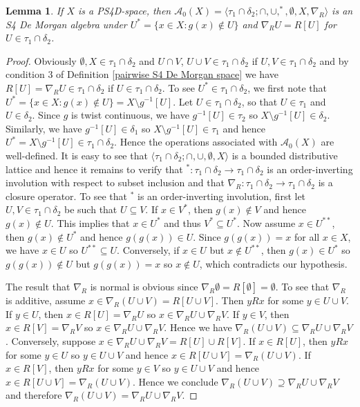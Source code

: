 \documentclass{amsart}
\theoremstyle{plain}
\newtheorem{lemma}[theorem]{Lemma}
\theoremstyle{definition}
\begin{document}
\begin{lemma}\label{space to algebra}
    If $X$ is a PS4D-space, then $\mathcal{A}_0(X)=\langle\tau_1\cap\delta_2;\cap,\cup,^*,\emptyset,X,\nabla_R\rangle$ is an S4 De Morgan algebra under $U^*=\{x\in X:g(x)\not\in U\}$ and $\nabla_RU=R[U]$ for $U\in\tau_1\cap\delta_2$.    \end{lemma}
\begin{proof}
    Obviously $\emptyset,X\in \tau_1\cap\delta_2$ and $U\cap V$, $U\cup V\in\tau_1\cap\delta_2$ if $U,V\in\tau_1\cap\delta_2$ and by condition 3 of Definition \ref{pairwise S4 De Morgan space} we have $R[U]=\nabla_R U\in\tau_1\cap\delta_2$ if $U\in\tau_1\cap\delta_2$. To see $U^*\in\tau_1\cap\delta_2$, we first note that $U^*=\{x\in X:g(x)\not\in U\}=X\setminus g^{-1}[U]$. Let $U\in\tau_1\cap\delta_2$, so that $U\in\tau_1$ and $U\in\delta_2$. Since $g$ is twist continuous, we have $g^{-1}[U]\in\tau_2$ so $X\setminus g^{-1}[U]\in\delta_2$. Similarly, we have $g^{-1}[U]\in \delta_1$ so $X\setminus g^{-1}[U]\in\tau_1$ and hence $U^*=X\setminus g^{-1}[U]\in\tau_1\cap\delta_2$. Hence the operations associated with $\mathcal{A}_0(X)$ are well-defined. It is easy to see that $\langle\tau_1\cap\delta_2;\cap,\cup,\emptyset,X\rangle$ is a bounded distributive lattice and hence it remains to verify that $^*\colon\tau_1\cap\delta_2\to\tau_1\cap\delta_2$ is an order-inverting involution with respect to subset inclusion and that $\nabla_R\colon\tau_1\cap\delta_2\to\tau_1\cap\delta_2$ is a closure operator. To see that $^*$ is an order-inverting involution, first let $U,V\in\tau_1\cap\delta_2$ be such that $U\subseteq V$. If $x\in V^*$, then $g(x)\not\in V$ and hence $g(x)\not\in U$. This implies that $x\in U^*$ and thus $V^*\subseteq U^*$. Now assume $x\in U^{**}$, then $g(x)\not\in U^*$ and hence $g(g(x))\in U$. Since $g(g(x))=x$ for all $x\in X$, we have $x\in U$ so $U^{**}\subseteq U$. Conversely, if $x\in U$ but $x\not\in U^{**}$, then $g(x)\in U^*$ so $g(g(x))\not\in U$ but $g(g(x))=x$ so $x\not\in U$, which contradicts our hypothesis.


The result that $\nabla_R$ is normal is obvious since $\nabla_R
\emptyset=R[\emptyset]=\emptyset$. To see that $\nabla_R$ is additive, assume $x\in \nabla_R(U\cup V)=R[U\cup V]$. Then $yRx$ for some $y\in U\cup V$. If $y\in U$, then $x\in R[U]=\nabla_RU$ so $x\in\nabla_R U\cup\nabla_RV$. If $y\in V$, then $x\in R[V]=\nabla_RV$ so $x\in \nabla_RU\cup\nabla_RV$. Hence we have $\nabla_R(U\cup V)\subseteq\nabla_R U\cup\nabla_RV$. Conversely, suppose $x\in\nabla_RU\cup\nabla_RV=R[U]\cup R[V]$. If $x\in R[U]$, then $yRx$ for some $y\in U$ so $y\in U\cup V$ and hence $x\in R[U\cup V]=\nabla_R(U\cup V)$. If $x\in R[V]$, then $yRx$ for some $y\in V$ so $y\in U\cup V$ and hence $x\in R[U\cup V]=\nabla_R(U\cup V)$. Hence we conclude $\nabla_R(U\cup V)\supseteq\nabla_RU\cup\nabla_RV$ and therefore $\nabla_R(U\cup V)=\nabla_RU\cup\nabla_RV$.    
    

\end{proof}
\end{document}
